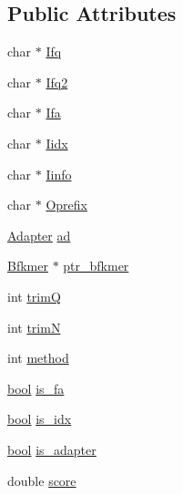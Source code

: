 \subsection*{Public Attributes}
\begin{DoxyCompactItemize}
\item 
char $\ast$ \hyperlink{struct__iparam__trimFilter_a5147310738277c148ca7109ba77829ca}{Ifq}
\item 
char $\ast$ \hyperlink{struct__iparam__trimFilter_a5c45337d4d046a995265bd2849ea4785}{Ifq2}
\item 
char $\ast$ \hyperlink{struct__iparam__trimFilter_a55796cd412ef4ca61a5a799d2f64beec}{Ifa}
\item 
char $\ast$ \hyperlink{struct__iparam__trimFilter_a158296e4d37ab3b033c6f9aee1516d71}{Iidx}
\item 
char $\ast$ \hyperlink{struct__iparam__trimFilter_aa1cf61870d64b1e49778dd72312ad707}{Iinfo}
\item 
char $\ast$ \hyperlink{struct__iparam__trimFilter_ad24f2902b532a4ff2dfb1122941064b8}{Oprefix}
\item 
\hyperlink{struct__trimFilter_8h_a3442d07a10a4ab75064687f3c244e370}{Adapter} \hyperlink{struct__iparam__trimFilter_aba4b2762da9029d272905c558986b3f7}{ad}
\item 
\hyperlink{bloom_8h_a4bf3f34a321ce545e533d29ce363f569}{Bfkmer} $\ast$ \hyperlink{struct__iparam__trimFilter_a63b9b54ab69ce2602ec37ececc59e131}{ptr\+\_\+bfkmer}
\item 
int \hyperlink{struct__iparam__trimFilter_a5b5344041c9313230de07c9485227203}{trim\+Q}
\item 
int \hyperlink{struct__iparam__trimFilter_a5f2d247cc26608ed5cc9e2d6943940d7}{trim\+N}
\item 
int \hyperlink{struct__iparam__trimFilter_a0b5f9bed4a7b4e2de8c917b42360f4d3}{method}
\item 
\hyperlink{defines_8h_abb452686968e48b67397da5f97445f5b}{bool} \hyperlink{struct__iparam__trimFilter_ac6093d26e41e61f82ffd2aa05f563f9c}{is\+\_\+fa}
\item 
\hyperlink{defines_8h_abb452686968e48b67397da5f97445f5b}{bool} \hyperlink{struct__iparam__trimFilter_afc50c477a3340ed7befc430d273ff6cb}{is\+\_\+idx}
\item 
\hyperlink{defines_8h_abb452686968e48b67397da5f97445f5b}{bool} \hyperlink{struct__iparam__trimFilter_a6d015b5bf1568c362d9ca0ff37b751f8}{is\+\_\+adapter}
\item 
double \hyperlink{struct__iparam__trimFilter_a193ef2030f6eb8db0b75afbbd152d6a1}{score}

\end{DoxyCompactItemize}
